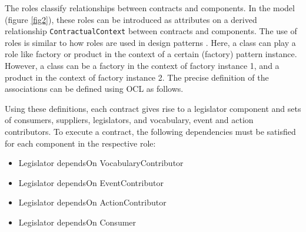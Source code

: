\documentclass{llncs}
\begin{document}
The roles classify relationships between contracts and components. In the model (figure \ref{fig2}), these roles can be introduced as attributes on a derived relationship \texttt{ContractualContext} between contracts and components. The use of roles is similar to how roles are used in design patterns \cite{GangOf4}. Here, a class can play a role like factory or product in the context of a certain (factory) pattern instance. However, a class can be a factory in the context of factory instance 1, and a product in the context of factory instance 2. The precise definition of the associations can be defined using OCL as follows. 




Using these definitions, each contract gives rise to a legislator component and sets of consumers, suppliers, legislators, and vocabulary, event and action contributors. To execute a contract, the following dependencies must be satisfied for each component in the respective role: 

\begin{itemize}
\item Legislator dependsOn VocabularyContributor
\item Legislator dependsOn EventContributor
\item Legislator dependsOn ActionContributor
\item Legislator dependsOn Consumer
\end{itemize}
\end{document}
